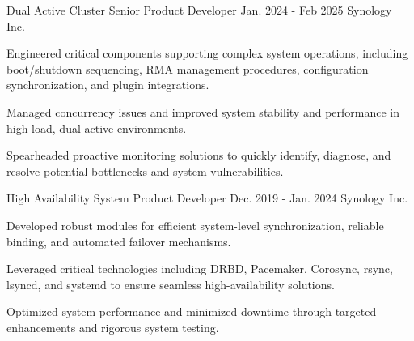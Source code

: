 
\begin{cventries}

  \cventry
    {Dual Active Cluster} %
    {Senior Product Developer} %
    {Jan. 2024 - Feb 2025} %
    {Synology Inc.} %
    {
      \begin{cvitems} %
        \item {Engineered critical components supporting complex system operations, including boot/shutdown sequencing, RMA management procedures, configuration synchronization, and plugin integrations.}
        \item {Managed concurrency issues and improved system stability and performance in high-load, dual-active environments.}
        \item {Spearheaded proactive monitoring solutions to quickly identify, diagnose, and resolve potential bottlenecks and system vulnerabilities.}
      \end{cvitems}
    }

  \cventry
    {High Availability System} %
    {Product Developer} %
    {Dec. 2019 - Jan. 2024} %
    {Synology Inc.} %
    {
      \begin{cvitems} %
        \item {Developed robust modules for efficient system-level synchronization, reliable binding, and automated failover mechanisms.}
        \item {Leveraged critical technologies including DRBD, Pacemaker, Corosync, rsync, lsyncd, and systemd to ensure seamless high-availability solutions.}
        \item {Optimized system performance and minimized downtime through targeted enhancements and rigorous system testing.}
      \end{cvitems}
    }


\end{cventries}
